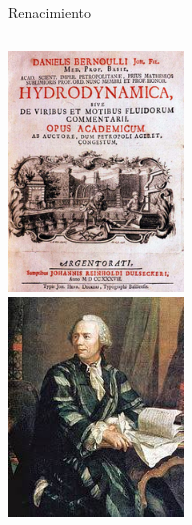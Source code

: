\documentclass [xcolor=svgnames, t] {beamer}
\begin{document}
\begin{frame}{Renacimiento}
\begin{columns}
\begin{center}
\includegraphics[width=0.8\textwidth]{hydrody}\\
\includegraphics[width=0.8\textwidth]{euler}
\end{center}
\end{columns}
\end{frame}
\end{document}
